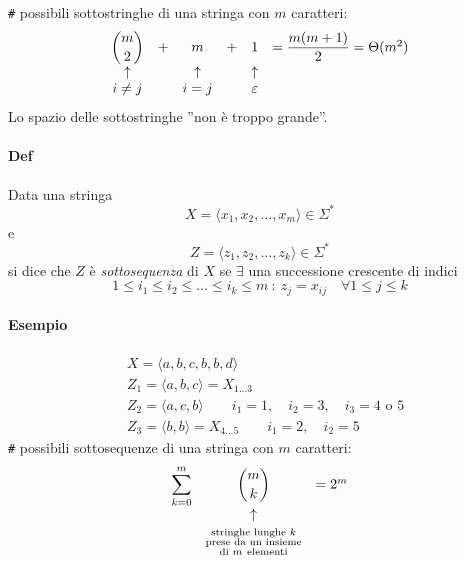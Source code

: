 \noindent \verb|#| possibili sottostringhe di una stringa con $m$ caratteri:
\begin{gather*}
	\begin{array}{cccccl}
		\dbinom{m}{2} & + & m & + & 1 & = \dfrac{m(m+1)}{2} = \Theta(m^2) \\
		\uparrow & & \uparrow & & \uparrow & \\
		i \neq j & & i = j & & \varepsilon &
	\end{array}
\end{gather*}
Lo spazio delle sottostringhe ''non è troppo grande''.

\paragraph{Def}
Data una stringa
$$X = \langle x_1,x_2,\dots,x_m\rangle \in \Sigma^*$$
e
$$Z = \langle z_1,z_2,\dots,z_k\rangle \in \Sigma^*$$
si dice che $Z$ è \emph{sottosequenza} di $X$ se $\exists$ una successione crescente di indici
$$1 \leq i_1 \leq i_2 \leq \dots \leq i_k \leq m \ : \ z_j = x_{ij} \quad \forall 1 \leq j \leq k$$
\paragraph{Esempio}
\begin{align*}
	& X = \langle a,b,c,b,b,d \rangle \\
	& Z_1 = \langle a,b,c \rangle = X_{1 \dots 3} \\
	& Z_2 = \langle a,c,b \rangle \qquad i_1 = 1, \quad i_2 = 3, \quad i_3 = 4 \text{ o } 5 \\
	& Z_3 = \langle b,b \rangle = X_{4 \dots 5} \qquad i_1 = 2, \quad i_2 = 5
\end{align*}
\verb|#| possibili sottosequenze di una stringa con $m$ caratteri:
\begin{gather*}
	\begin{array}{lcl}
		\displaystyle\sum_{k=0}^{m} & \dbinom{m}{k} & = 2^m \\
		& \uparrow & \\
		& \text{\scriptsize stringhe lunghe } \scriptstyle k & \\[-5pt]
		& \text{\scriptsize prese da un insieme} & \\[-5pt]
		& \text{\scriptsize di } \scriptstyle m \ \text{\scriptsize elementi} &
	\end{array}
\end{gather*}



